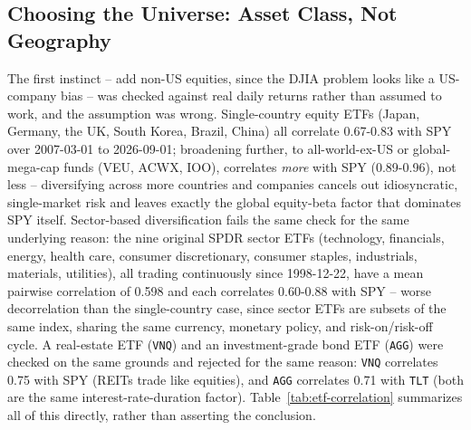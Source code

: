 \documentclass[11pt]{article}
\begin{document}
\subsection{Choosing the Universe: Asset Class, Not Geography}
\label{sec:etf-choice}

The first instinct -- add non-US equities, since the DJIA problem looks
like a US-company bias -- was checked against real daily returns rather
than assumed to work, and the assumption was wrong. Single-country
equity ETFs (Japan, Germany, the UK, South Korea, Brazil, China) all
correlate 0.67-0.83 with SPY over 2007-03-01 to 2026-09-01; broadening
further, to all-world-ex-US or global-mega-cap funds (VEU, ACWX, IOO),
correlates \emph{more} with SPY (0.89-0.96), not less -- diversifying
across more countries and companies cancels out idiosyncratic,
single-market risk and leaves exactly the global equity-beta factor
that dominates SPY itself. Sector-based diversification fails the same
check for the same underlying reason: the nine original SPDR sector
ETFs (technology, financials, energy, health care, consumer
discretionary, consumer staples, industrials, materials, utilities),
all trading continuously since 1998-12-22, have a mean pairwise
correlation of 0.598 and each correlates 0.60-0.88 with SPY -- worse
decorrelation than the single-country case, since sector ETFs are
subsets of the same index, sharing the same currency, monetary policy,
and risk-on/risk-off cycle. A real-estate ETF (\texttt{VNQ}) and an
investment-grade bond ETF (\texttt{AGG}) were checked on the same
grounds and rejected for the same reason: \texttt{VNQ} correlates 0.75
with SPY (REITs trade like equities), and \texttt{AGG} correlates 0.71
with \texttt{TLT} (both are the same interest-rate-duration factor).
Table~\ref{tab:etf-correlation} summarizes all of this directly, rather
than asserting the conclusion.
\end{document}
